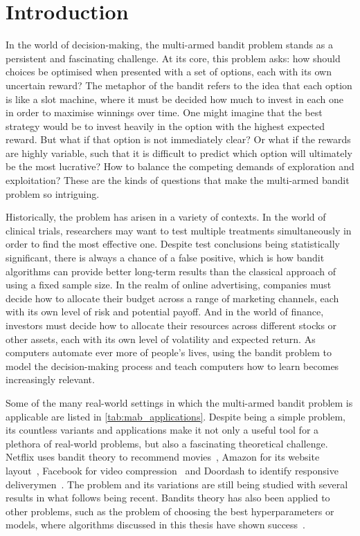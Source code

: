 \chapter{Introduction}
\label{ch:intro}
In the world of decision-making, the multi-armed bandit problem stands as a persistent and fascinating challenge.
At its core, this problem asks: how should choices be optimised when presented with a set of options, each with its own uncertain reward?
The metaphor of the bandit refers to the idea that each option is like a slot machine, where it must be decided how much to invest in each one in order to maximise winnings over time.
One might imagine that the best strategy would be to invest heavily in the option with the highest expected reward.
But what if that option is not immediately clear?
Or what if the rewards are highly variable, such that it is difficult to predict which option will ultimately be the most lucrative?
How to balance the competing demands of exploration and exploitation?
These are the kinds of questions that make the multi-armed bandit problem so intriguing.

Historically, the problem has arisen in a variety of contexts.
In the world of clinical trials, researchers may want to test multiple treatments simultaneously in order to find the most effective one.
Despite test conclusions being statistically significant, there is always a chance of a false positive, which is how bandit algorithms can provide better long-term results than the classical approach of using a fixed sample size.
In the realm of online advertising, companies must decide how to allocate their budget across a range of marketing channels, each with its own level of risk and potential payoff.
And in the world of finance, investors must decide how to allocate their resources across different stocks or other assets, each with its own level of volatility and expected return.
As computers automate ever more of people's lives, using the bandit problem to model the decision-making process and teach computers how to learn becomes increasingly relevant.

Some of the many real-world settings in which the multi-armed bandit problem is applicable are listed in \cref{tab:mab_applications}.
Despite being a simple problem, its countless variants and applications make it not only a useful tool for a plethora of real-world problems, but also a fascinating theoretical challenge.
Netflix uses bandit theory to recommend movies~\autocite{kawale2018}, Amazon for its website layout~\autocite{hill2017}, Facebook for video compression~\autocite{daulton2019} and Doordash to identify responsive deliverymen~\autocite{sharma2022}.
The problem and its variations are still being studied with several results in what follows being recent.
Bandits theory has also been applied to other problems, such as the problem of choosing the best hyperparameters or models, where algorithms discussed in this thesis have shown success~\autocite{gagliolo2010,wang2014,bouneffouf2017}.

